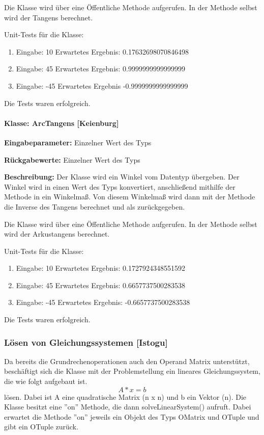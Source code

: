 Die Klasse wird über eine Öffentliche Methode aufgerufen. In der Methode selbst wird der Tangens berechnet. 

Unit-Tests für die Klasse: 	
\begin{enumerate}
	\item Eingabe:  10 Erwartetes Ergebnis: 0.17632698070846498
	\item Eingabe:  45 Erwartetes Ergebnis: 0.9999999999999999
	\item Eingabe: -45 Erwartetes Ergebnis -0.9999999999999999
\end{enumerate}
Die Tests waren erfolgreich.

\paragraph{Klasse: ArcTangens [Keienburg]}
\textbf{Eingabeparameter: } Einzelner Wert des Typs 

\textbf{Rückgabewerte: } Einzelner Wert des Typs 

\textbf{Beschreibung: }Der Klasse wird ein Winkel vom Datentyp  übergeben. Der Winkel wird in einen Wert des Typs  konvertiert, anschließend mithilfe der Methode  in ein Winkelmaß. Von diesem Winkelmaß wird dann mit der Methode  die Inverse des Tangens berechnet und als  zurückgegeben. 
 
Die Klasse wird über eine Öffentliche Methode aufgerufen. In der Methode selbst wird der Arkustangens berechnet. 

Unit-Tests für die Klasse: 	
\begin{enumerate}
	\item Eingabe:  10 Erwartetes Ergebnis: 0.1727924348551592
	\item Eingabe:  45 Erwartetes Ergebnis: 0.6657737500283538
	\item Eingabe: -45 Erwartetes Ergebnis: -0.6657737500283538
\end{enumerate}
Die Tests waren erfolgreich.

\subsubsection{Lösen von Gleichungssystemen [Istogu]}

Da bereits die Grundrechenoperationen auch den Operand Matrix unterstützt, beschäftigt sich die Klasse  mit der Problemstellung ein lineares Gleichungssystem, die wie folgt aufgebaut ist.
\[A*x=b\]
lösen. Dabei ist A eine quadratische Matrix (n x n) und b ein Vektor (n).
Die Klasse besitzt eine ''on'' Methode, die dann solveLinearSystem() aufruft. Dabei erwartet die Methode ''on'' jeweils ein Objekt des Typs OMatrix und OTuple und gibt ein OTuple zurück. 

